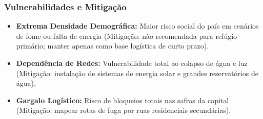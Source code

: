 \subsubsection{Vulnerabilidades e
Mitigação}

\begin{itemize}
\tightlist
\item
  \textbf{Extrema Densidade Demográfica:} Maior risco social do país em
  cenários de fome ou falta de energia (Mitigação: não recomendada para
  refúgio primário; manter apenas como base logística de curto prazo).
\item
  \textbf{Dependência de Redes:} Vulnerabilidade total ao colapso de
  água e luz (Mitigação: instalação de sistemas de energia solar e
  grandes reservatórios de água).
\item
  \textbf{Gargalo Logístico:} Risco de bloqueios totais nas safras da
  capital (Mitigação: mapear rotas de fuga por ruas residenciais
  secundárias).
\end{itemize}

